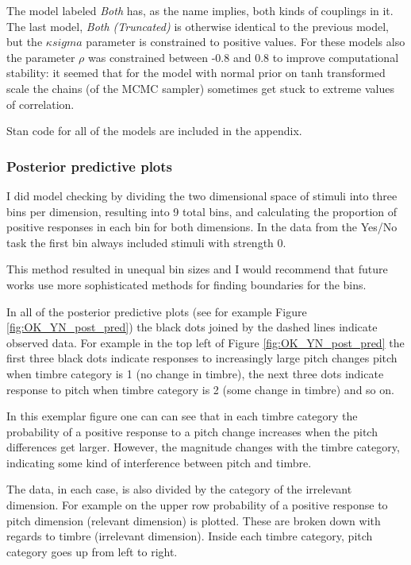 \documentclass{article}\usepackage{knitr}
\begin{document}
The model labeled \textit{Both} has, as the name implies, both kinds of couplings in it. The last model, \textit{Both (Truncated)} is otherwise identical to the previous model, but the $\kappa{sigma}$ parameter is constrained to positive values. For these models also the parameter $\rho$ was constrained between -0.8 and 0.8 to improve computational stability: it seemed that for the model with normal prior on tanh transformed scale the chains (of the MCMC sampler) sometimes get stuck to extreme values of correlation.

Stan code for all of the models are included in the appendix. 

\subsubsection{Posterior predictive plots}

I did model checking by dividing the two dimensional space of stimuli into three bins per dimension, resulting into 9 total bins, and calculating the proportion of positive responses in each bin for both dimensions. In the data from the Yes/No task the first bin always included stimuli with strength 0.

This method resulted in unequal bin sizes and I would recommend that future works use more sophisticated methods for finding boundaries for the bins. 

In all of the posterior predictive plots (see for example Figure \ref{fig:OK_YN_post_pred}) the black dots joined by the dashed lines indicate observed data. For example in the top left of Figure \ref{fig:OK_YN_post_pred} the first three black dots indicate responses to increasingly large pitch changes pitch when timbre category is 1 (no change in timbre), the next three dots indicate response to pitch when timbre category is 2 (some change in timbre) and so on. 

In this exemplar figure one can can see that in each timbre category the probability of a positive response to a pitch change increases when the pitch differences get larger. However, the magnitude changes with the timbre category, indicating some kind of interference between pitch and timbre.

The data, in each case, is also divided by the category of the irrelevant dimension. For example on the upper row probability of a positive response to pitch dimension (relevant dimension) is plotted. These are broken down with regards to timbre (irrelevant dimension). Inside each timbre category, pitch category goes up from left to right. 
\end{document}
